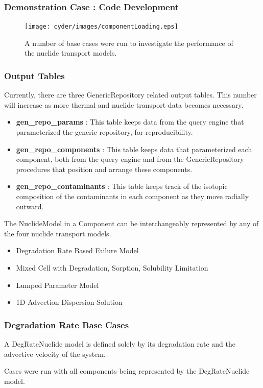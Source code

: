 
\begin{frame}[ctb!]
  \frametitle{Demonstration Case : Code Development}
  \begin{figure}[htbp!]
    \begin{center}
      \texttt{[image: cyder/images/componentLoading.eps]}
      \caption{A number of base cases were run to investigate the performance of 
      the nuclide transport models.}
    \end{center}
  \end{figure}
\end{frame}


\begin{frame}
  \frametitle{Output Tables}
  Currently, there are three GenericRepository related output tables. This 
  number will increase as more thermal and  nuclide transport data becomes 
  necessary.

  \begin{itemize}
  \item \textbf{gen\_repo\_params} : This table keeps data from the query engine 
    that parameterized the generic repository, for reproducibility.
  \item \textbf{gen\_repo\_components} : This table keeps data that 
    parameterized each component, both from the query engine and from the 
    GenericRepository procedures that position and arrange these components. 
  \item \textbf{gen\_repo\_contaminants} : This table keeps track of the 
    isotopic composition of the contaminants in each component as they move 
    radially outward. 
\end{itemize}
\end{frame}


\begin{frame}
  The NuclideModel in a Component can be interchangeably represented by any of 
  the four nuclide transport models. 
    \begin{itemize}
      \item Degradation Rate Based Failure Model
      \item Mixed Cell with Degradation, Sorption, Solubility Limitation
      \item Lumped Parameter Model
      \item 1D Advection Dispersion Solution
    \end{itemize}
\end{frame}

\begin{frame}
  \frametitle{Degradation Rate Base Cases}
  A DegRateNuclide model is defined solely by its degradation rate and the 
  advective velocity of the system. 

  Cases were run with all components being represented by the DegRateNuclide 
  model.  
\end{frame}


